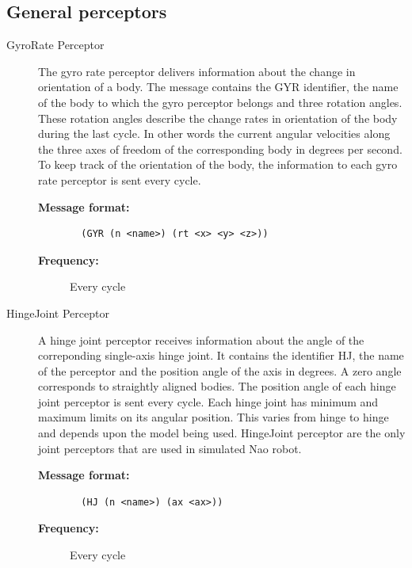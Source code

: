 \subsection{General perceptors}
\begin{description}
  \item [GyroRate Perceptor]
  The gyro rate perceptor delivers information about the change in orientation of a body. The message contains the GYR identifier, the name of the body to which the gyro perceptor belongs and three rotation angles. These rotation angles describe the change rates in orientation of the body during the last cycle. In other words the current angular velocities along the three axes of freedom of the corresponding body in degrees per second. To keep track of the orientation of the body, the information to each gyro rate perceptor is sent every cycle.\cite{SimSpark}
  \begin{description}
  \item[{\bf Message format:}]
  \begin{verbatim}
  (GYR (n <name>) (rt <x> <y> <z>))
  \end{verbatim}
  \item[{\bf Frequency:}]
  Every cycle
  \end{description}




  \item [HingeJoint Perceptor]
  A hinge joint perceptor receives information about the angle of the correponding single-axis hinge joint. It contains the identifier HJ, the name of the perceptor and the position angle of the axis in degrees. A zero angle corresponds to straightly aligned bodies. The position angle of each hinge joint perceptor is sent every cycle.
Each hinge joint has minimum and maximum limits on its angular position. This varies from hinge to hinge and depends upon the model being used. HingeJoint perceptor are the only joint perceptors that are used in simulated Nao robot. \cite{SimSpark}
 \begin{description}
  \item[{\bf Message format:}]
  \begin{verbatim}
  (HJ (n <name>) (ax <ax>))
  \end{verbatim}
  \item[{\bf Frequency:}]
  Every cycle
  \end{description}
  
  
  

\end{description}
